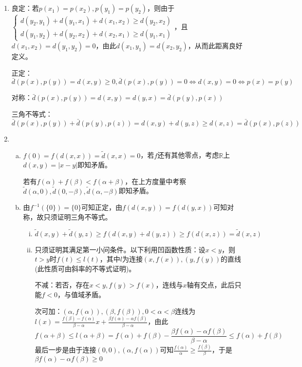\documentclass[a4paper,UTF8,fontset=windows]{ctexart}
\begin{document}
\subsection{}
\begin{enumerate}[(1)]
    \item
    良定：若$p(x_1)=p(x_2),p(y_1)=p(y_2)$，则由于$\begin{cases}d(y_2,y_1)+d(y_1,x_1)+d(x_1,x_2)\ge d(y_2,x_2)\\d(y_1,y_2)+d(y_2,x_2)+d(x_2,x_1)\ge d(y_1,x_1)\end{cases}$，且$d(x_1,x_2)=d(y_1,y_2)=0$，由此$d(x_1,y_1)=d(x_2,y_2)$，从而此距离良好定义。
    
    正定：$\bar{d}(p(x),p(y))=d(x,y)\ge0,\bar{d}(p(x),p(y))=0\Leftrightarrow d(x,y)=0\Leftrightarrow p(x)=p(y)$
    
    对称：$\bar{d}(p(x),p(y))=d(x,y)=d(y,x)=\bar{d}(p(y),p(x))$
    
    三角不等式：$\bar{d}(p(x),p(y))+\bar{d}(p(y),p(z))=d(x,y)+d(y,z)\ge d(x,z)=\bar{d}(p(x),p(z))$
    
    \item
    \begin{enumerate}[(a)]
    \item
    $f(0)=f(d(x,x))=\tilde{d}(x,x)=0$，若$f$还有其他零点，考虑$\mathbb{R}$上$d(x,y)=|x-y|$即知矛盾。
    
    若有$f(\alpha)+f(\beta)<f(\alpha+\beta)$，在上方度量中考察$\tilde{d}(\alpha,0),\tilde{d}(0,-\beta),\tilde{d}(\alpha,-\beta)$即知矛盾。
    
    \item
    由$f^{-1}(\{0\})=\{0\}$可知正定，由$f(d(x,y))=f(d(y,x))$可知对称，故只须证明三角不等式。
    \begin{enumerate}[(i)]
    \item
    $\tilde{d}(x,y)+\tilde{d}(y,z)\ge f(d(x,y)+d(y,z))\ge f(d(x,z))=\tilde{d}(x,z)$
    
    \item
    只须证明其满足第一小问条件。以下利用凹函数性质：设$x<y$，则$t>y$时$f(t)\le l(t)$，其中$l$为连接$(x,f(x)),(y,f(y))$的直线(此性质可由斜率的不等式证明)。
    
    不减：若否，存在$x<y,f(y)>f(x)$，连线与$x$轴有交点，此后只能$f<0$，与值域矛盾。
    
    次可加：$(\alpha,f(\alpha)),(\beta,f(\beta)),0<\alpha<\beta$连线为$l(x)=\frac{f(\beta)-f(\alpha)}{\beta-\alpha}x+\frac{\beta f(\alpha)-\alpha f(\beta)}{\beta-\alpha}$，由此
    \[f(\alpha+\beta)\le l(\alpha+\beta)=f(\alpha)+f(\beta)-\frac{\beta f(\alpha)-\alpha f(\beta)}{\beta-\alpha}\le f(\alpha)+f(\beta)\]
    最后一步是由于连接$(0,0),(\alpha,f(\alpha))$可知$\frac{f(\alpha)}{\alpha}\ge\frac{f(\beta)}{\beta}$，于是$\beta f(\alpha)-\alpha f(\beta)\ge0$
    

\end{enumerate}
\end{enumerate}
\end{enumerate}
\end{document}
